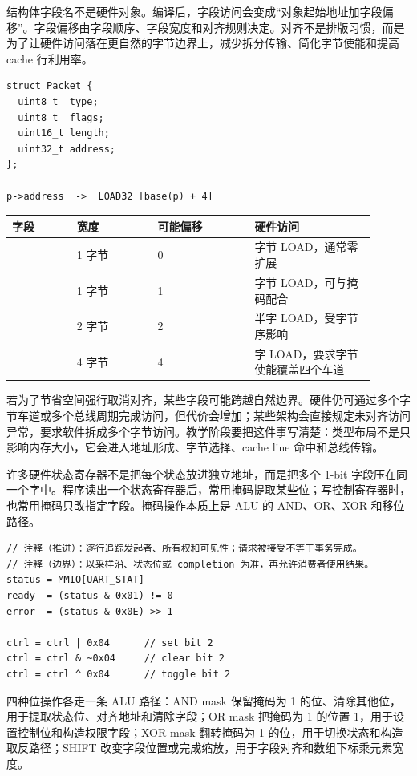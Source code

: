 结构体字段名不是硬件对象。编译后，字段访问会变成“对象起始地址加字段偏移”。字段偏移由字段顺序、字段宽度和对齐规则决定。对齐不是排版习惯，而是为了让硬件访问落在更自然的字节边界上，减少拆分传输、简化字节使能和提高 cache 行利用率。

\begin{lstlisting}
struct Packet {
  uint8_t  type;
  uint8_t  flags;
  uint16_t length;
  uint32_t address;
};

p->address  ->  LOAD32 [base(p) + 4]
\end{lstlisting}

\begin{longtable}{L{0.16\linewidth}L{0.2\linewidth}L{0.24\linewidth}L{0.3\linewidth}}
\toprule
字段 & 宽度 & 可能偏移 & 硬件访问 \\
\midrule
{} & 1 字节 & 0 & 字节 LOAD，通常零扩展 \\\tablerowrule
{} & 1 字节 & 1 & 字节 LOAD，可与掩码配合 \\\tablerowrule
{} & 2 字节 & 2 & 半字 LOAD，受字节序影响 \\\tablerowrule
{} & 4 字节 & 4 & 字 LOAD，要求字节使能覆盖四个车道 \\
\bottomrule
\end{longtable}

若为了节省空间强行取消对齐，某些字段可能跨越自然边界。硬件仍可通过多个字节车道或多个总线周期完成访问，但代价会增加；某些架构会直接规定未对齐访问异常，要求软件拆成多个字节访问。教学阶段要把这件事写清楚：类型布局不是只影响内存大小，它会进入地址形成、字节选择、cache line 命中和总线传输。

许多硬件状态寄存器不是把每个状态放进独立地址，而是把多个 1-bit 字段压在同一个字中。程序读出一个状态寄存器后，常用掩码提取某些位；写控制寄存器时，也常用掩码只改指定字段。掩码操作本质上是 ALU 的 AND、OR、XOR 和移位路径。

\begin{lstlisting}
// 注释（推进）：逐行追踪发起者、所有权和可见性；请求被接受不等于事务完成。
// 注释（边界）：以采样沿、状态位或 completion 为准，再允许消费者使用结果。
status = MMIO[UART_STAT]
ready  = (status & 0x01) != 0
error  = (status & 0x0E) >> 1

ctrl = ctrl | 0x04      // set bit 2
ctrl = ctrl & ~0x04     // clear bit 2
ctrl = ctrl ^ 0x04      // toggle bit 2
\end{lstlisting}

四种位操作各走一条 ALU 路径：AND mask 保留掩码为 1 的位、清除其他位，用于提取状态位、对齐地址和清除字段；OR mask 把掩码为 1 的位置 1，用于设置控制位和构造权限字段；XOR mask 翻转掩码为 1 的位，用于切换状态和构造取反路径；SHIFT 改变字段位置或完成缩放，用于字段对齐和数组下标乘元素宽度。

